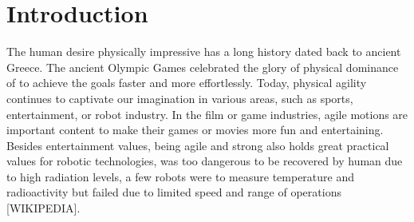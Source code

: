 \chapter{Introduction}

The human desire  physically impressive has a long history
dated back to ancient Greece.
The ancient Olympic Games celebrated the glory of physical dominance of
 to achieve the goals
faster and more effortlessly. 
Today, physical agility continues to captivate our imagination in
various areas, such as sports, entertainment, or robot industry.
In the film or game industries, agile motions are important content to make
their games or movies more fun and entertaining.
Besides entertainment values, being agile and strong also holds great practical
values for robotic technologies, 
was too dangerous to be recovered
by human due to high radiation levels, a few robots were  to
measure temperature and radioactivity but failed due to limited speed and range
of operations [WIKIPEDIA].


